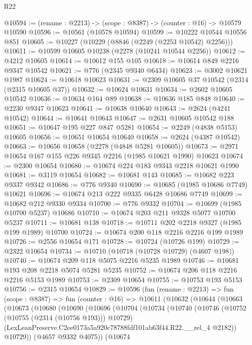 \begin{lexlean}{R22}
\begin{coremodule}
@10594 := (rename : @2213) -> (scope : @8387) -> (counter : @16) -> @10579 @10590
@10596 := @10561 (@10578 @10594)
@10599 := @10222 @10544 @10556 @851
@10605 := @10227 (@10229 (@8846 (@2249 (@2253 @10542) @2256)))
@10611 := @10599 @10605 @10238 (@2278 (@10241 @10544 @2256))
@10612 := @4212 @10605
@10614 := @10612 @155 @105
@10618 := @10614 @849 @2216 @9347 @10542
@10621 := @776 (@2345 @9340 @6434)
@10623 := @3002 @10621 @1987
@10624 := @10618 @10623
@10631 := @2309 @10605 @37 @10542 (@2314 (@2315 @10605 @37))
@10632 := @10624 @10631
@10634 := @2602 @10605 @10542
@10636 := @10634 @164 @89
@10638 := @10636 @185 @848
@10640 := @2230 @9347 @10623
@10641 := @10638 @10640
@10643 := @2624 (@4241 @10542)
@10644 := @10641 @10643
@10647 := @2631 @10605 @10542 @188
@10651 := @10647 @195 @227 @847 @5281
@10654 := @2249 (@4838 @5153) @10605
@10656 := @10651 @10654 @10640
@10658 := @2624 (@4387 @10542)
@10663 := @10656 @10658 (@2278 (@4848 @5281 @10605))
@10673 := @2971 @10654 @167 @155 @226 @9345 @2216 (@1985 @10621 @1990) @10623
@10674 := @2300 @10654
@10680 := @10674 @224 @183 @9343 @2218 @10621 @1990
@10681 := @3119 @10654
@10682 := @10681 @143
@10685 := @10682 @223 @9337 @9342
@10686 := @776 @9340
@10690 := @10685 (@1985 @10686 @7749) @10621
@10696 := @10674 @213 @222 @9335 @6428 @10686 @7749
@10699 := @10682 @212 @9330 @9334
@10700 := @776 @9332
@10704 := @10699 (@1985 @10700 @5237) @10686
@10710 := @10674 @203 @211 @9328 @5077 @10700 @5237
@10711 := @10681 @138
@10718 := @10711 @202 @2218 @9327 (@1985 @199 @1989) @10700
@10724 := @10674 @200 @118 @2216 @2216 @199 @1989
@10726 := @2556 @10654 @171
@10728 := @10724 (@10726 @199)
@10729 := @2322 @10654
@10734 := @10710 (@10718 (@10728 @10729) (@4607 @198))
@10740 := @10674 @209 @118 @5075 @2216 @5235 @1989
@10746 := @10681 @193 @208 @2218 @5074 @5281 @5235
@10752 := @10674 @206 @118 @2216 @2216 @5153 @1989
@10753 := @2309 @10654
@10755 := @10753 @193 @5153
@10756 := @2315 @10654
@10829 := @10596
    (fun (rename : @2213) =>
    fun (scope : @8387) =>
    fun (counter : @16) =>
    @10611
      (@10632
        (@10644
          (@10663
            (@10673
              (@10680
                (@10690
                  (@10696
                    (@10704
                      (@10734
                        (@10740
                          (@10746
                            (@10752 (@10755 (@2314 (@10756 @193))) @10729)
                            (LexLeanPreserve.C2ee0173a5a920c78788fdf101ab63f44.R22.__rel_4 @2182))
                          @10729))
                      (@4657 @9332 @4075))
                    (@10674

\end{coremodule}
\end{lexlean}
